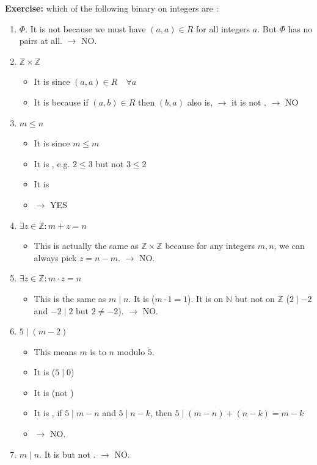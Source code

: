 \textbf{Exercise: }which of the following binary  on integers are :
\begin{enumerate}
\item $\Phi$. It is not  because we must have $(a,a)\in R$ for all integers $a$. But $\Phi$ has no pairs at all. $\to$ NO.
\item $\mathbb{Z} \times \mathbb{Z}$
\begin{itemize}
    \item It is  since $(a,a) \in R \quad \forall a$
    \item It is  because if $(a,b) \in R$ then $(b,a)$ also is, $\to$ it is not , $\to$ NO
\end{itemize}
\item $m \leq n$
\begin{itemize}
    \item It is  since $m \leq m$
    \item It is , e.g. $2 \leq 3$ but not $3 \leq 2$
    \item It is 
    \item $\to$ YES
\end{itemize}
\item $\exists z \in \mathbb{Z}:m + z = n$
\begin{itemize}
    \item This is actually the same as $\mathbb{Z} \times \mathbb{Z}$ because for any integers $m,n$, we can always pick $z = n-m$. $\to$ NO.
\end{itemize}
\item $\exists z \in \mathbb{Z}:m \cdot z = n$
\begin{itemize}
    \item This is the same as $m \mid n$. It is  ($m \cdot 1 = 1$). It is  on $\mathbb{N}$ but not on $\mathbb{Z}$ ($2 \mid -2$ and $-2 \mid 2$ but $2 \neq -2$). $\to$ NO.
\end{itemize}
\item $5 \mid (m-2)$
\begin{itemize}
    \item This means $m$ is  to $n$ modulo $5$.
    \item It is  ($5 \mid 0$)
    \item It is  (not )
    \item It is , if $5 \mid m-n$ and $5 \mid n-k$, then $5 \mid (m-n) + (n-k) = m-k$
    \item $\to$ NO. 
\end{itemize}
\item $m \mid n$. It is  but not . $\to$ NO.
\end{enumerate}

